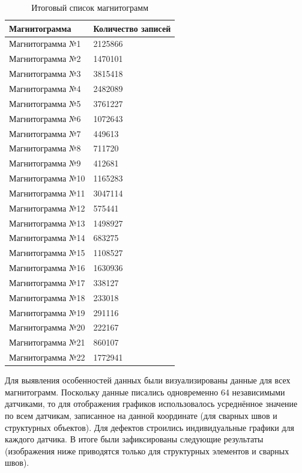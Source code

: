 \documentclass[a4paper,article,14pt]{extarticle}
\begin{document}
\begin{center}
    \begin{longtable}{|p{5cm}|p{5cm}|}
        \caption{Итоговый список магнитограмм}\\\hline
        Магнитограмма & Количество записей \\ \hline
        Магнитограмма №1 & 2125866 \\ \hline
        Магнитограмма №2 & 1470101 \\ \hline
        Магнитограмма №3 & 3815418 \\ \hline
        Магнитограмма №4 & 2482089 \\ \hline
        Магнитограмма №5 & 3761227 \\ \hline
        Магнитограмма №6 & 1072643 \\ \hline
        Магнитограмма №7 & 449613 \\ \hline
        Магнитограмма №8 & 711720 \\ \hline
        Магнитограмма №9 & 412681 \\ \hline
        Магнитограмма №10 & 1165283 \\ \hline
        Магнитограмма №11 & 3047114 \\ \hline
        Магнитограмма №12 & 575441 \\ \hline
        Магнитограмма №13 & 1498927\\ \hline
        Магнитограмма №14 & 683275 \\ \hline
        Магнитограмма №15 & 1108527 \\ \hline
        Магнитограмма №16 & 1630936 \\ \hline 
        Магнитограмма №17 & 338127 \\ \hline
        Магнитограмма №18 & 233018 \\ \hline
        Магнитограмма №19 & 291116 \\ \hline
        Магнитограмма №20 & 222167 \\ \hline
        Магнитограмма №21 & 860107 \\ \hline
        Магнитограмма №22 & 1772941 \\ \hline
    \end{longtable}
\end{center}

Для выявления особенностей данных были визуализированы данные для всех магнитограмм. 
Поскольку данные писались одновременно 64 независимыми датчиками, 
то для отображения графиков использовалось усреднённое значение по всем датчикам, 
записанное на данной координате (для сварных швов и структурных объектов). 
Для дефектов строились индивидуальные графики для каждого датчика. 
В итоге были зафиксированы следующие результаты (изображения ниже приводятся только для 
структурных элементов и сварных швов).
\end{document}
